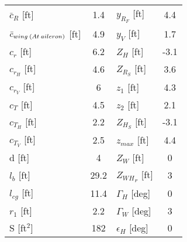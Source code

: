 \documentclass[letterpaper,12pt]{article}
\begin{document}
\begin{center}
\begin{tabular}{lclc}
$\bar{c}_R$ [ft] &\hspace*{-3cm} 1.4 & $y_{R_F}$ [ft] & 4.4\vspace*{0.12cm}\\
$\bar{c}_{wing\hspace*{2pt}(At\hspace*{2pt}aileron)}$ [ft] &\hspace*{-3cm} 4.9 & $y_V$ [ft] & 1.7\vspace*{0.12cm}\\
$c_r$ [ft] &\hspace*{-3cm}  6.2& $Z_H$ [ft] & -3.1\vspace*{0.12cm}\\
$c_{r_H}$ [ft] &\hspace*{-3cm}  4.6& $Z_{R_S}$ [ft] & 3.6\vspace*{0.12cm}\\
$c_{r_V}$ [ft] &\hspace*{-3cm}  6& $z_1$ [ft] & 4.3\vspace*{0.12cm}\\
$c_T$ [ft] &\hspace*{-3cm}  4.5& $z_2$ [ft] & 2.1\vspace*{0.12cm}\\
$c_{T_H}$ [ft] &\hspace*{-3cm}  2.2& $Z_{H_S}$ [ft] & -3.1\vspace*{0.12cm}\\
$c_{T_V}$ [ft] &\hspace*{-3cm}  2.5& $z_{max}$ [ft] & 4.4\vspace*{0.12cm}\\
d [ft] &\hspace*{-3cm}  4& $Z_W$ [ft] & 0\vspace*{0.12cm}\\
$l_b$ [ft] &\hspace*{-3cm}  29.2& ${Z_{WH}}_r$ [ft] & 3\vspace*{0.12cm}\\
$l_{cg}$ [ft] &\hspace*{-3cm}  11.4& $\Gamma_H$ [deg] & 0\vspace*{0.12cm}\\
$r_1$ [ft] &\hspace*{-3cm}  2.2& $\Gamma_W$ [deg] & 3\vspace*{0.12cm}\\
S [ft$^2$] &\hspace*{-3cm}  182& $\epsilon_H$ [deg] & 0\vspace*{0.12cm}\\

\end{tabular}
\end{center}
\end{document}
